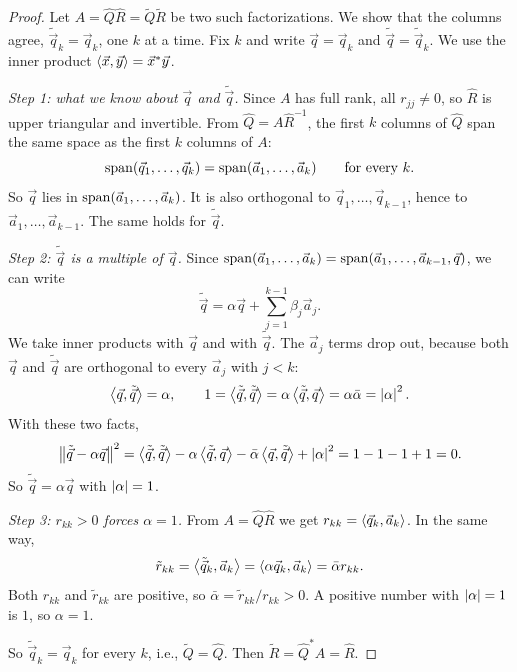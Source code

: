 \begin{proof}
  Let $A = \hat{Q}\hat{R} = \tilde{Q}\tilde{R}$ be two such factorizations. We show that the columns agree, $\tilde{\vec{q}}_k = \vec{q}_k$, one $k$ at a time. Fix $k$ and write $\vec{q} = \vec{q}_k$ and $\tilde{\vec{q}} = \tilde{\vec{q}}_k$. We use the inner product $\left\langle \vec{x}, \vec{y} \right\rangle = \vec{x}^\ast\vec{y}$.

  \emph{Step 1: what we know about $\vec{q}$ and $\tilde{\vec{q}}$.} Since $A$ has full rank, all $r_{jj} \ne 0$, so $\hat{R}$ is upper triangular and invertible. From $\hat{Q} = A\hat{R}^{-1}$, the first $k$ columns of $\hat{Q}$ span the same space as the first $k$ columns of $A$:
  \begin{equation}
    \operatorname{span}(\vec{q}_1, \dots, \vec{q}_k) = \operatorname{span}(\vec{a}_1, \dots, \vec{a}_k) \qquad \text{for every } k.
  \end{equation}
  So $\vec{q}$ lies in $\operatorname{span}(\vec{a}_1, \dots, \vec{a}_k)$. It is also orthogonal to $\vec{q}_1, \dots, \vec{q}_{k-1}$, hence to $\vec{a}_1, \dots, \vec{a}_{k-1}$. The same holds for $\tilde{\vec{q}}$.

  \emph{Step 2: $\tilde{\vec{q}}$ is a multiple of $\vec{q}$.} Since $\operatorname{span}(\vec{a}_1, \dots, \vec{a}_k) = \operatorname{span}(\vec{a}_1, \dots, \vec{a}_{k-1}, \vec{q})$, we can write
  \begin{equation}
    \tilde{\vec{q}} = \alpha\vec{q} + \sum_{j=1}^{k-1}\beta_j\vec{a}_j.
  \end{equation}
  We take inner products with $\vec{q}$ and with $\tilde{\vec{q}}$. The $\vec{a}_j$ terms drop out, because both $\vec{q}$ and $\tilde{\vec{q}}$ are orthogonal to every $\vec{a}_j$ with $j < k$:
  \begin{equation}
    \left\langle \vec{q}, \tilde{\vec{q}} \right\rangle = \alpha, \qquad 1 = \left\langle \tilde{\vec{q}}, \tilde{\vec{q}} \right\rangle = \alpha\left\langle \tilde{\vec{q}}, \vec{q} \right\rangle = \alpha\bar{\alpha} = \left\lvert \alpha \right\rvert^2.
  \end{equation}
  With these two facts,
  \begin{equation}
    \left\lVert \tilde{\vec{q}} - \alpha\vec{q} \right\rVert^2 = \left\langle \tilde{\vec{q}}, \tilde{\vec{q}} \right\rangle - \alpha\left\langle \tilde{\vec{q}}, \vec{q} \right\rangle - \bar{\alpha}\left\langle \vec{q}, \tilde{\vec{q}} \right\rangle + \left\lvert \alpha \right\rvert^2 = 1 - 1 - 1 + 1 = 0.
  \end{equation}
  So $\tilde{\vec{q}} = \alpha\vec{q}$ with $\left\lvert \alpha \right\rvert = 1$.

  \emph{Step 3: $r_{kk} > 0$ forces $\alpha = 1$.} From $A = \hat{Q}\hat{R}$ we get $r_{kk} = \left\langle \vec{q}_k, \vec{a}_k \right\rangle$. In the same way,
  \begin{equation*}
    \tilde{r}_{kk} = \left\langle \tilde{\vec{q}}_k, \vec{a}_k \right\rangle = \left\langle \alpha\vec{q}_k, \vec{a}_k \right\rangle = \bar{\alpha}r_{kk}.
  \end{equation*}
  Both $r_{kk}$ and $\tilde{r}_{kk}$ are positive, so $\bar{\alpha} = \tilde{r}_{kk}/r_{kk} > 0$. A positive number with $\left\lvert \alpha \right\rvert = 1$ is $1$, so $\alpha = 1$.

  So $\tilde{\vec{q}}_k = \vec{q}_k$ for every $k$, i.e., $\tilde{Q} = \hat{Q}$. Then $\tilde{R} = \hat{Q}^\ast A = \hat{R}$.
\end{proof}

